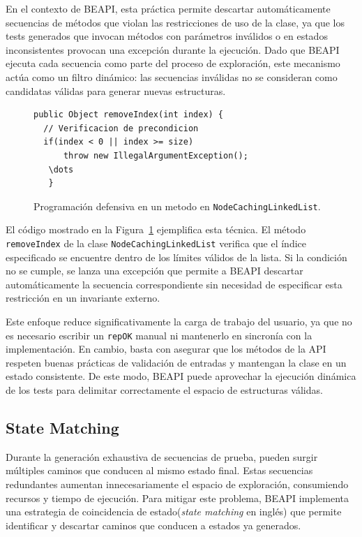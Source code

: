 En el contexto de \textsf{BEAPI}, esta práctica permite descartar automáticamente secuencias de métodos que violan las restricciones de uso 
de la clase, ya que los tests generados que invocan métodos con parámetros inválidos o en estados inconsistentes provocan una excepción 
durante la ejecución. Dado que \textsf{BEAPI} ejecuta cada secuencia como parte del proceso de exploración, este mecanismo actúa 
como un filtro dinámico: las secuencias inválidas no se consideran como candidatas válidas para generar nuevas estructuras.

\begin{figure}[!htb]
\begin{lstlisting}
public Object removeIndex(int index) {
  // Verificacion de precondicion
  if(index < 0 || index >= size)
      throw new IllegalArgumentException();  
   \dots
   }
\end{lstlisting}
\caption{Programación defensiva en un metodo en \texttt{NodeCachingLinkedList}.}
\label{fig:algoProgDefensiva}
\end{figure}

El código mostrado en la Figura~\ref{fig:algoProgDefensiva} ejemplifica esta técnica. 
El método \texttt{removeIndex} de la clase \texttt{NodeCachingLinkedList} verifica que el índice especificado se encuentre dentro de los límites válidos de la lista. 
Si la condición no se cumple, se lanza una excepción que permite a \textsf{BEAPI} descartar automáticamente la secuencia correspondiente 
sin necesidad de especificar esta restricción en un invariante externo.

Este enfoque reduce significativamente la carga de trabajo del usuario, ya que no es necesario escribir un \texttt{repOK} manual ni mantenerlo 
en sincronía con la implementación. En cambio, basta con asegurar que los métodos de la API respeten buenas prácticas de validación 
de entradas y mantengan la clase en un estado consistente. 
De este modo, \textsf{BEAPI} puede aprovechar la ejecución dinámica de los tests para delimitar correctamente el espacio de estructuras válidas.


\subsection{State Matching}
\label{sec:stateMatching}
Durante la generación exhaustiva de secuencias de prueba, pueden surgir múltiples caminos que conducen al mismo estado final. 
Estas secuencias redundantes aumentan innecesariamente el espacio de exploración, consumiendo recursos y tiempo de ejecución. 
Para mitigar este problema, \textsf{BEAPI} implementa una estrategia de coincidencia de estado(\emph{state matching} en inglés) que permite identificar y descartar caminos que conducen a estados ya generados.

